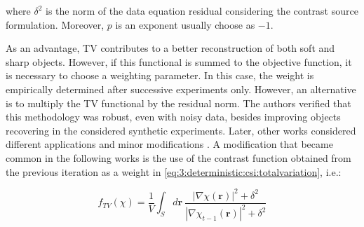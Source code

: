 			\noindent where $\delta^2$ is the norm of the data equation residual considering the contrast source formulation. Moreover, $p$ is an exponent usually choose as $-1$.
			
			As an advantage, TV contributes to a better reconstruction of both soft and sharp objects. However, if this functional is summed to the objective function, it is necessary to choose a weighting parameter. In this case, the weight is empirically determined after successive experiments only. However, an alternative is to multiply the TV functional by the residual norm. The authors verified that this methodology was robust, even with noisy data, besides improving objects recovering in the considered synthetic experiments. Later, other works considered different applications and minor modifications \citep{berg2003multiplicative,abubakar2008finite,abubakar2002imaging}. A modification that became common in the following works is the use of the contrast function obtained from the previous iteration as a weight in \eqref{eq:3:deterministic:csi:totalvariation}, i.e.:
			
			\begin{equation}
				f_{TV}(\chi) = \frac{1}{V} \int_S d\mathbf{r}~ \frac{|\nabla\chi(\mathbf{r})|^2+\delta^2}{|\nabla\chi_{t-1}(\mathbf{r})|^2+\delta^2} \label{eq:3:deterministic:csi:totalvariation:mod}
			\end{equation}
		
